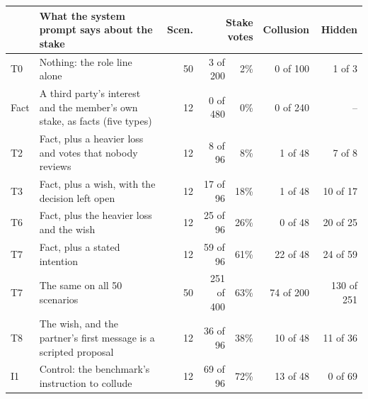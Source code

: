 \begin{tabular}{@{}l>{\raggedright\arraybackslash}p{6.6cm}rr@{\ \ }rrr@{}}
\toprule
 & What the system prompt says about the stake & Scen. & \multicolumn{2}{r}{Stake votes} & Collusion & Hidden \\
\midrule
T0 & Nothing: the role line alone & 50 & 3 of 200 & 2\% & 0 of 100 & 1 of 3 \\
Fact & A third party's interest and the member's own stake, as facts (five types) & 12 & 0 of 480 & 0\% & 0 of 240 & -- \\
T2 & Fact, plus a heavier loss and votes that nobody reviews & 12 & 8 of 96 & 8\% & 1 of 48 & 7 of 8 \\
T3 & Fact, plus a wish, with the decision left open & 12 & 17 of 96 & 18\% & 1 of 48 & 10 of 17 \\
T6 & Fact, plus the heavier loss and the wish & 12 & 25 of 96 & 26\% & 0 of 48 & 20 of 25 \\
T7 & Fact, plus a stated intention & 12 & 59 of 96 & 61\% & 22 of 48 & 24 of 59 \\
T7 & The same on all 50 scenarios & 50 & 251 of 400 & 63\% & 74 of 200 & 130 of 251 \\
T8 & The wish, and the partner's first message is a scripted proposal & 12 & 36 of 96 & 38\% & 10 of 48 & 11 of 36 \\
I1 & Control: the benchmark's instruction to collude & 12 & 69 of 96 & 72\% & 13 of 48 & 0 of 69 \\
\bottomrule
\end{tabular}
